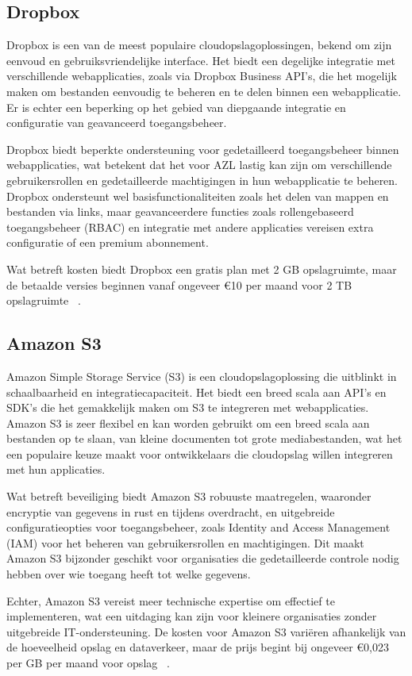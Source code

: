 \subsection{Dropbox}
Dropbox is een van de meest populaire cloudopslagoplossingen, bekend om zijn eenvoud en gebruiksvriendelijke interface. Het biedt een degelijke integratie met verschillende webapplicaties, zoals via Dropbox Business API's, die het mogelijk maken om bestanden eenvoudig te beheren en te delen binnen een webapplicatie. Er is echter een beperking op het gebied van diepgaande integratie en configuratie van geavanceerd toegangsbeheer.

Dropbox biedt beperkte ondersteuning voor gedetailleerd toegangsbeheer binnen webapplicaties, wat betekent dat het voor AZL lastig kan zijn om verschillende gebruikersrollen en gedetailleerde machtigingen in hun webapplicatie te beheren. Dropbox ondersteunt wel basisfunctionaliteiten zoals het delen van mappen en bestanden via links, maar geavanceerdere functies zoals rollengebaseerd toegangsbeheer (RBAC) en integratie met andere applicaties vereisen extra configuratie of een premium abonnement.

Wat betreft kosten biedt Dropbox een gratis plan met 2 GB opslagruimte, maar de betaalde versies beginnen vanaf ongeveer €10 per maand voor 2 TB opslagruimte ~\autocite{Dropbox2024}.

\subsection{Amazon S3}
Amazon Simple Storage Service (S3) is een cloudopslagoplossing die uitblinkt in schaalbaarheid en integratiecapaciteit. Het biedt een breed scala aan API's en SDK's die het gemakkelijk maken om S3 te integreren met webapplicaties. Amazon S3 is zeer flexibel en kan worden gebruikt om een breed scala aan bestanden op te slaan, van kleine documenten tot grote mediabestanden, wat het een populaire keuze maakt voor ontwikkelaars die cloudopslag willen integreren met hun applicaties.

Wat betreft beveiliging biedt Amazon S3 robuuste maatregelen, waaronder encryptie van gegevens in rust en tijdens overdracht, en uitgebreide configuratieopties voor toegangsbeheer, zoals Identity and Access Management (IAM) voor het beheren van gebruikersrollen en machtigingen. Dit maakt Amazon S3 bijzonder geschikt voor organisaties die gedetailleerde controle nodig hebben over wie toegang heeft tot welke gegevens.

Echter, Amazon S3 vereist meer technische expertise om effectief te implementeren, wat een uitdaging kan zijn voor kleinere organisaties zonder uitgebreide IT-ondersteuning. De kosten voor Amazon S3 variëren afhankelijk van de hoeveelheid opslag en dataverkeer, maar de prijs begint bij ongeveer €0,023 per GB per maand voor opslag ~\autocite{AWS2024}.


